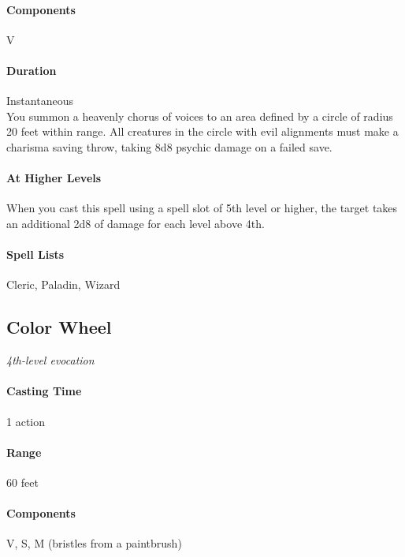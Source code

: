 \paragraph{Components} V
\paragraph{Duration} Instantaneous\\
\hfill \break
You summon a heavenly chorus of voices to an area defined by a circle of radius 20 feet within range. All creatures in the circle with evil alignments must make a charisma saving throw, taking 8d8 psychic damage on a failed save. 
\hfill \break
\paragraph{At Higher Levels} When you cast this spell using a spell slot of 5th level or higher, the target takes an additional 2d8 of damage for each level above 4th.
\hfill \break
\paragraph{Spell Lists} Cleric, Paladin, Wizard

\subsection{Color Wheel}
\textit{4th-level evocation}
\hfill \break
\paragraph{Casting Time} 1 action
\paragraph{Range} 60 feet
\paragraph{Components} V, S, M (bristles from a paintbrush)
